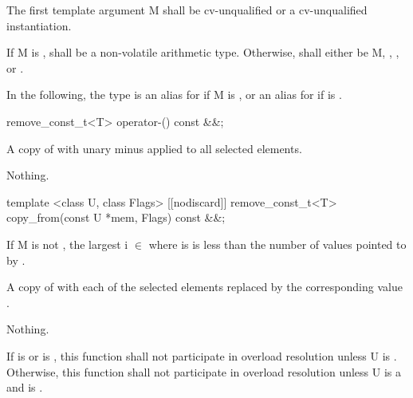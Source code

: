 \pnum The first template argument \type M shall be cv-unqualified \bool or a cv-unqualified \mask instantiation.

\pnum
If \type M is \bool,  shall be a non-volatile arithmetic type.
Otherwise,  shall either be \type M, , , or .

\pnum In the following, the type  is an alias for  if \type M is \bool, or an alias for  if  is \true.

\pnum{}

\begin{itemdecl}
remove_const_t<T> operator-() const &&;
\end{itemdecl}
\begin{itemdescr}
  \pnum\returns A copy of  with unary minus applied to all selected elements.

  \pnum\throws Nothing.
\end{itemdescr}

\begin{itemdecl}
template <class U, class Flags>
[[nodiscard]] remove_const_t<T> copy_from(const U *mem, Flags) const &&;
\end{itemdecl}
\begin{itemdescr}
  If \type M is not \bool, the largest i $\in$ \code{[0, M::size())} where  is \true is less than the number of values pointed to by .

  \pnum\returns A copy of  with each of the selected elements replaced by the corresponding value  .

  \pnum\throws Nothing.

  \pnum\remarks If  is \bool or  is \true, this function shall not participate in overload resolution unless \type U is \bool.
  Otherwise, this function shall not participate in overload resolution unless \type U is a \realArithmeticType and  is \true.
\end{itemdescr}

